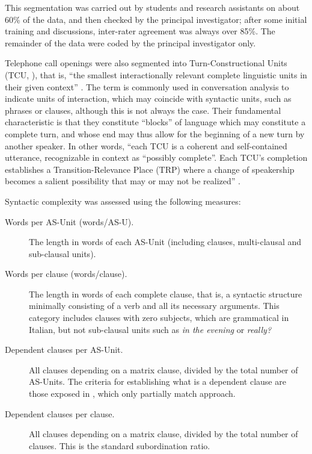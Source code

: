 \documentclass[output=paper]{langscibook}
\begin{document}
This segmentation was carried out by students and research assistants on about 60\% of the data, and then checked by the principal investigator; after some initial training and discussions, inter-rater agreement was always over 85\%. The remainder of the data were coded by the principal investigator only. 

Telephone call openings were also segmented into Turn-Constructional Units (TCU, \citealt{SacksEtAl1974}), that is, “the smallest interactionally relevant complete linguistic units in their given context” \citep[512]{Selting2000}. The term is commonly used in conversation analysis to indicate units of interaction, which may coincide with syntactic units, such as phrases or clauses, although this is not always the case. Their fundamental characteristic is that they constitute “blocks” of language which may constitute a complete turn, and whose end may thus allow for the beginning of a new turn by another speaker. In other words, “each TCU is a coherent and self-contained utterance, recognizable in context as “possibly complete”. Each TCU’s completion establishes a Transition-Relevance Place (TRP) where a change of speakership becomes a salient possibility that may or may not be realized” \citep[151]{Clayman2012}.

Syntactic complexity was assessed using the following measures:

\begin{description}
\item[Words per AS-Unit (words/AS-U).] The length in words of each AS-Unit (including clauses, multi-clausal and sub-clausal units).

\item[Words per clause (words/clause).]  The length in words of each complete clause, that is, a syntactic structure minimally consisting of a verb and all its necessary arguments. This category includes clauses with zero subjects, which are grammatical in Italian, but not sub-clausal units such as \textit{in the evening} or \textit{really?} 

\item[Dependent clauses per AS-Unit.] All clauses depending on a matrix clause, divided by the total number of AS-Units. The criteria for establishing what is a dependent clause are those exposed in \citet{Ferrari2020}, which only partially match  approach.

\item[Dependent clauses per clause.] All clauses depending on a matrix clause, divided by the total number of clauses. This is the standard subordination ratio.
\end{description}
\end{document}
